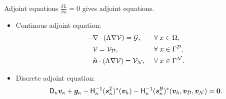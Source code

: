 \documentclass{beamer}
\begin{document}
\begin{frame}{Adjoint equations}
    \Large
    $\frac{\delta L}{\delta u} = 0$ \normalsize gives adjoint equations.
    
    \vskip 2mm
    \begin{itemize}
        \item Continous adjoint equation:
        \begin{equation*}
        \begin{aligned}
        -&\nabla\cdot\left(\Lambda \nabla\mathcal{V} \right) = \mathcal{G},\quad &&\forall \; x \in \Omega, \\
        &\mathcal{V} = \mathcal{V}_{\mathcal{D}}, \quad &&\forall \; x \in \Gamma^{\mathcal{D}},  \\
        &\hat{\bm{n}} \cdot \left( \Lambda \nabla \mathcal{V}\right) = \mathcal{V}_{\mathcal{N}},
        &&\forall \; x \in \Gamma^{\mathcal{N}}.
        \end{aligned}
        \end{equation*}
        \item Discrete adjoint equation:
        \begin{equation*}\label{eq:adjoint_SBP}
        \mathsf{D}_{\kappa} \bm{v}_\kappa + \bm{g}_{\kappa}
        - \mathsf{H}_{\kappa}^{-1} (\bm{s}_{\kappa}^{\mathcal{I}})^{*}(\bm{v}_h)
        - \mathsf{H}_{\kappa}^{-1} (\bm{s}_{\kappa}^{\mathcal{B}})^{*}(\bm{v}_h,\bm{v}_{\mathcal{D}},\bm{v}_{\mathcal{N}})
        = \bm{0}.
        \end{equation*}
    \end{itemize}
\end{frame}
\end{document}
